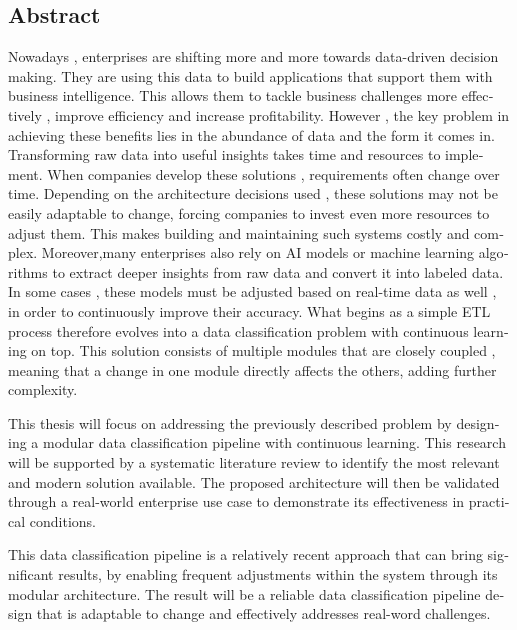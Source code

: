 

\begin{otherlanguage}{american}
    \chapter*{Abstract}
    Nowadays , enterprises are shifting more and more towards data-driven decision making. They are using this data to build applications that support them with business intelligence. This allows them to tackle business challenges more effectively , improve efficiency and increase profitability. However , the key problem in achieving these benefits lies in the abundance of data and the form it comes in. Transforming raw data into useful insights takes time and resources to implement. When companies develop these solutions , requirements often change over time. Depending on the architecture decisions used , these solutions may not be easily adaptable to change, forcing companies to invest even more resources to adjust them. This makes building and maintaining such systems costly and complex. Moreover,many enterprises also rely on AI models or machine learning algorithms to extract deeper insights from raw data and convert it into labeled data. In some cases , these models must be adjusted based on real-time data as well , in order to continuously improve their accuracy. What begins as a simple ETL process therefore evolves into a data classification problem with continuous learning on top. This solution consists of multiple modules that are closely coupled , meaning that a change in one module directly affects the others, adding further complexity.
    \smallbreak

    This thesis will focus on addressing the previously described problem by designing a modular data classification pipeline with continuous learning. This research will be supported by a systematic literature review to identify the most relevant and modern solution available. The proposed architecture will then be validated through a real-world enterprise use case to demonstrate its effectiveness in practical conditions.
    \smallbreak

    This data classification pipeline is a relatively recent approach that can bring significant results, by enabling frequent adjustments within the system through its modular architecture. The result will be a reliable data classification pipeline design that is adaptable to change and effectively addresses real-word challenges.

\end{otherlanguage}
